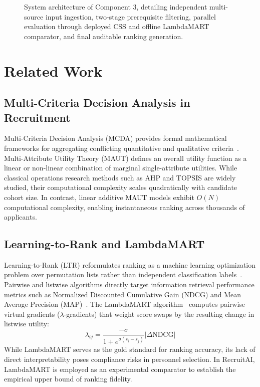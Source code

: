 \documentclass[conference]{IEEEtran}
\begin{document}
\begin{figure}[t]
\caption{System architecture of Component 3, detailing independent multi-source input ingestion, two-stage prerequisite filtering, parallel evaluation through deployed CSS and offline LambdaMART comparator, and final auditable ranking generation.}
\label{fig:c3_arch}
\end{figure}

\section{Related Work}
\subsection{Multi-Criteria Decision Analysis in Recruitment}
Multi-Criteria Decision Analysis (MCDA) provides formal mathematical frameworks for aggregating conflicting quantitative and qualitative criteria~\cite{saaty1980analytic}. Multi-Attribute Utility Theory (MAUT) defines an overall utility function as a linear or non-linear combination of marginal single-attribute utilities. While classical operations research methods such as AHP and TOPSIS are widely studied, their computational complexity scales quadratically with candidate cohort size. In contrast, linear additive MAUT models exhibit $O(N)$ computational complexity, enabling instantaneous ranking across thousands of applicants.

\subsection{Learning-to-Rank and LambdaMART}
Learning-to-Rank (LTR) reformulates ranking as a machine learning optimization problem over permutation lists rather than independent classification labels~\cite{burges2010ranknet}. Pairwise and listwise algorithms directly target information retrieval performance metrics such as Normalized Discounted Cumulative Gain (NDCG) and Mean Average Precision (MAP)~\cite{jarvelin2002cumulated}. The LambdaMART algorithm~\cite{ke2017lightgbm} computes pairwise virtual gradients ($\lambda$-gradients) that weight score swaps by the resulting change in listwise utility:
\begin{equation}
\lambda_{ij} = \frac{-\sigma}{1 + e^{\sigma(s_i - s_j)}} |\Delta\text{NDCG}|
\end{equation}
While LambdaMART serves as the gold standard for ranking accuracy, its lack of direct interpretability poses compliance risks in personnel selection. In RecruitAI, LambdaMART is employed as an experimental comparator to establish the empirical upper bound of ranking fidelity.
\end{document}
